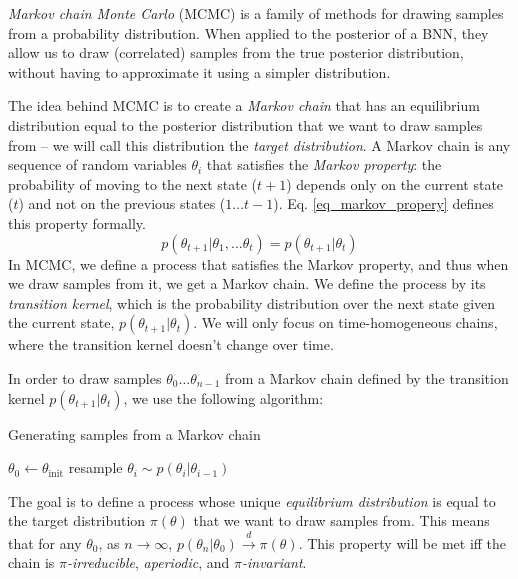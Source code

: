 \documentclass[12pt]{article}
\begin{document}
\textit{Markov chain Monte Carlo} (MCMC) is a family of methods for drawing samples from a probability distribution. When applied to the posterior of a BNN, they allow us to draw (correlated) samples from the true posterior distribution, without having to approximate it using a simpler distribution.

The idea behind MCMC is to create a \textit{Markov chain} that has an equilibrium distribution equal to the posterior distribution that we want to draw samples from -- we will call this distribution the \textit{target distribution}. A Markov chain is any sequence of random variables $\theta_i$ that satisfies the \textit{Markov property}: the probability of moving to the next state ($t+1$) depends only on the current state ($t$) and not on the previous states ($1 \ldots t-1$). Eq. \ref{eq_markov_propery} defines this property formally.
\begin{equation}
p(\theta_{t+1}|\theta_1,\ldots \theta_t)=p(\theta_{t+1}|\theta_t)
\label{eq_markov_propery}
\end{equation}
In MCMC, we define a process that satisfies the Markov property, and thus when we draw samples from it, we get a Markov chain. We define the process by its \textit{transition kernel}, which is the probability distribution over the next state given the current state, $p(\theta_{t+1}|\theta_t)$. We will only focus on time-homogeneous chains, where the transition kernel doesn't change over time.

In order to draw samples $\theta_0 \ldots \theta_{n-1}$ from a Markov chain defined by the transition kernel $p(\theta_{t+1}|\theta_t)$, we use the following algorithm:

\begin{algorithm}
\caption{Generating samples from a Markov chain}
\label{alg_mh}
\begin{algorithmic}
\State $\theta_0 \gets \theta_{\textrm{init}}$
	\State resample $\theta_i \sim p(\theta_i|\theta_{i-1})$
\EndFor
\end{algorithmic}
\end{algorithm}

The goal is to define a process whose unique \textit{equilibrium distribution} is equal to the target distribution $\pi(\theta)$ that we want to draw samples from. This means that for any $\theta_0$, as $n \rightarrow \infty$, $p(\theta_n|\theta_0) \xrightarrow{d} \pi(\theta)$. This property will be met iff the chain is \textit{$\pi$-irreducible}, \textit{aperiodic}, and \textit{$\pi$-invariant}.
\end{document}
